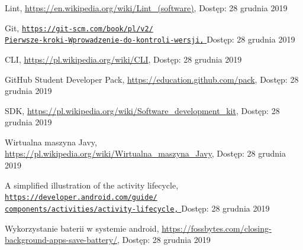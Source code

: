 \documentclass[a4paper,12pt, twoside]{article}
\begin{document}
\begin{thebibliography}{}
    		Lint,
    		\newline\url{https://en.wikipedia.org/wiki/Lint_(software)}, 
    		\newline Dostęp: 28 grudnia 2019
    		
    		\newpage
    		Git,
    		\newline\href{https://git-scm.com/book/pl/v2/Pierwsze-kroki-Wprowadzenie-do-kontroli-wersji}
    		 {\nolinkurl{https://git-scm.com/book/pl/v2/}
                 \\
                  \nolinkurl{Pierwsze-kroki-Wprowadzenie-do-kontroli-wersji,}
                 }
    		\newline Dostęp: 28 grudnia 2019
    
    		CLI,
    		\newline\url{https://pl.wikipedia.org/wiki/CLI}, 
    		\newline Dostęp: 28 grudnia 2019
    		
    		GitHub Student Developer Pack,
    		\newline\url{https://education.github.com/pack}, 
    		\newline Dostęp: 28 grudnia 2019
    		
    		SDK,
    		\newline\url{https://pl.wikipedia.org/wiki/Software_development_kit}, 
    		\newline Dostęp: 28 grudnia 2019
    		
    		Wirtualna maszyna Javy,
    		\newline\url{https://pl.wikipedia.org/wiki/Wirtualna_maszyna_Javy}, 
    		\newline Dostęp: 28 grudnia 2019
    		
    		A simplified illustration of the activity lifecycle,
    		\newline\href{https://developer.android.com/guide/components/activities/activity-lifecycle}
    		 {\nolinkurl{https://developer.android.com/guide/}
                 \\
                  \nolinkurl{components/activities/activity-lifecycle,}
                 }
    		\newline Dostęp: 28 grudnia 2019
    		
    		Wykorzystanie baterii w systemie android,
    		\newline\url{https://fossbytes.com/closing-background-apps-save-battery/}, 
    		\newline Dostęp: 28 grudnia 2019
    		

\end{thebibliography}
\end{document}

